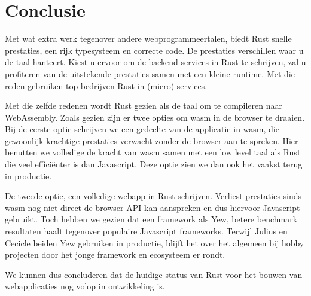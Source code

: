\chapter{Conclusie}

Met wat extra werk tegenover andere webprogrammeertalen, biedt Rust snelle prestaties, een rijk
typesysteem en correcte code. De prestaties verschillen waar u de taal hanteert. Kiest u ervoor om
de backend services in Rust te schrijven, zal u profiteren van de uitstekende prestaties samen met
een kleine runtime. Met die reden gebruiken top bedrijven Rust in (micro) services.

Met die zelfde redenen wordt Rust gezien als de taal om te compileren naar WebAssembly. Zoals gezien
zijn er twee opties om wasm in de browser te draaien. Bij de eerste optie schrijven we een gedeelte
van de applicatie in wasm, die gewoonlijk krachtige prestaties verwacht zonder de browser aan te
spreken. Hier benutten we volledige de kracht van wasm samen met een low level taal als Rust
die veel efficiënter is dan Javascript. Deze optie zien we dan ook het vaakst terug in productie.

De tweede optie, een volledige webapp in Rust schrijven. Verliest prestaties sinds wasm nog niet
direct de browser API kan aanspreken en dus hiervoor Javascript gebruikt. Toch hebben we gezien dat
een framework als Yew, betere benchmark resultaten haalt tegenover populaire Javascript frameworks.
Terwijl Julius en Cecicle beiden Yew gebruiken in productie, blijft het over het algemeen bij hobby
projecten door het jonge framework en ecosysteem er rondt.

We kunnen dus concluderen dat de huidige status van Rust voor het bouwen van webapplicaties nog
volop in ontwikkeling is.
